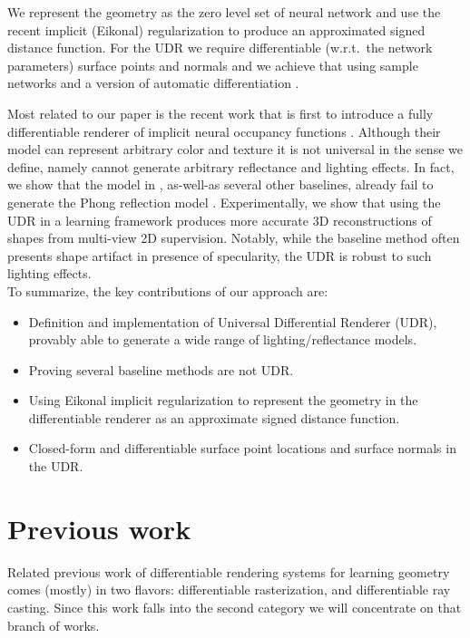\documentclass[runningheads]{llncs}
\begin{document}
We represent the geometry as the zero level set of neural network and use the recent implicit (Eikonal) regularization \cite{gropp2020implicit} to produce an approximated signed distance function. For the UDR we require differentiable (w.r.t.~the network parameters) surface points and normals and we achieve that using sample networks \cite{atzmon2019controlling} and a version of automatic differentiation \cite{gropp2020implicit}. 

Most related to our paper is the recent work \cite{niemeyer2019differentiable} that is first to introduce a fully differentiable renderer of implicit neural occupancy functions \cite{mescheder2019occupancy}. Although their model can represent arbitrary color and texture it is not universal in the sense we define, namely cannot generate arbitrary reflectance and lighting effects. In fact, we show that the model in \cite{niemeyer2019differentiable}, as-well-as several other baselines, already fail to generate the Phong reflection model \cite{foley1996computer}.  
%
Experimentally, we show that using the UDR in a learning framework produces more accurate 3D reconstructions of shapes from multi-view 2D supervision. Notably, while the baseline method often presents shape artifact in presence of specularity, the UDR is robust to such lighting effects.\\ 

\noindent To summarize, the key contributions of our approach are:
\begin{itemize}[label=$\bullet$]
    \item Definition and implementation of Universal Differential Renderer (UDR), provably able to generate a wide range of lighting/reflectance models. 
    \item Proving several baseline methods are not UDR.
    \item Using Eikonal implicit regularization to represent the geometry in the differentiable renderer as an approximate signed distance function.
    \item Closed-form and differentiable surface point locations and surface normals in the UDR. 
\end{itemize}


\section{Previous work}
Related previous work of differentiable rendering systems for learning geometry comes (mostly) in two flavors: differentiable rasterization, and differentiable ray casting. Since this work falls into the second category we will concentrate on that branch of works. 
\end{document}
